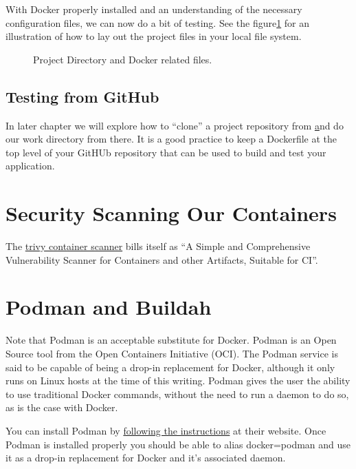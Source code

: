 \justify{}
With Docker properly installed and an understanding of the necessary configuration files, we can now do a bit of testing.
See the figure\ref{dockerdirectory} for an illustration of how to lay out the project files in your local file system.

\begin{figure}[!htb]
  \centering
  
  \caption{Project Directory and Docker related files.}
\label{dockerdirectory}
\end{figure}


\subsection{Testing from GitHub}
\justify{}
In later chapter we will explore how to ``clone'' a project repository from \href{github.com} and do our work directory
from there. It is a good practice to keep a Dockerfile at the top level of your GitHUb repository that can be used to
build and test your application.

\section{Security Scanning Our Containers}
The \href{https://github.com/aquasecurity/trivy}{trivy container scanner} bills itself
as ``A Simple and Comprehensive Vulnerability Scanner for Containers and other
Artifacts, Suitable for CI''.


\section{Podman and Buildah}

\justify{}
Note that Podman is an acceptable substitute for Docker.
Podman is an Open Source tool from the Open
Containers Initiative (OCI). The Podman service is said to be capable
of being a drop-in replacement for Docker, although it only
runs on Linux hosts at the time of this writing. Podman gives
the user the ability to use traditional Docker commands,
without the need to run a daemon to do so\cite{podman}, as is
the case with Docker.

\justify{}
You can install Podman by 
\href{https://podman.io/getting-started/installation.html}{following the instructions}
at their website. Once Podman is installed properly you should be able to alias docker=podman and use it as a
drop-in replacement for Docker and it's associated daemon.

